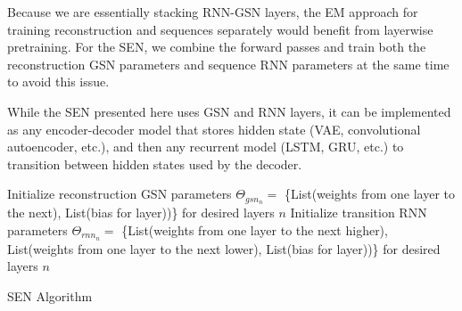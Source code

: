 Because we are essentially stacking RNN-GSN layers, the EM approach for training reconstruction and sequences separately would benefit from layerwise pretraining. For the SEN, we combine the forward passes and train both the reconstruction GSN parameters and sequence RNN parameters at the same time to avoid this issue.

While the SEN presented here uses GSN and RNN layers, it can be implemented as any encoder-decoder model that stores hidden state (VAE, convolutional autoencoder, etc.), and then any recurrent model (LSTM, GRU, etc.) to transition between hidden states used by the decoder.

 \begin{algorithm}[h!]
	Initialize reconstruction GSN parameters \(\Theta_{gsn_n} = \) \{List(weights from one layer to the next), List(bias for layer))\} for desired layers \(n\)\;
	Initialize transition RNN parameters \(\Theta_{rnn_n} = \) \{List(weights from one layer to the next higher), List(weights from one layer to the next lower), List(bias for layer))\} for desired layers \(n\)\;
	\caption{ SEN Algorithm }
\end{algorithm}



